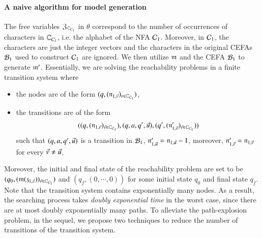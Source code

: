 \paragraph*{A naive algorithm for model generation}
The free variables $\mathfrak{Z}_{\mathbb{C}_{\mathcal{C}_1}}$ in $\theta$ correspond to the number of occurrences of characters in $\mathbb{C}_{\mathcal{C}_1}$, i.e. the alphabet of the NFA $\mathcal{C}_1$. Moreover, in $\mathcal{C}_1$, the characters are just the integer vectors and the characters in the original CEFAs $\mathcal{B}_1$ used to construct $\mathcal{C}_1$ are ignored. 
We then utilize $\mathfrak{m}$ and the CEFA $\mathcal{B}_1$ to generate $\mathfrak{m}'$. Essentially, we are solving the reachability problems in a finite transition system where 
\begin{itemize}
\item the nodes are of the form $(q, (\mathfrak{n}_{1, \vec{v}})_{v \in \mathbb{C}_{\mathcal{C}_1}})$,
%
\item the transitions are of the form 
$$((q, (\mathfrak{n}_{1, \vec{v}})_{\vec{v} \in \mathbb{C}_{\mathcal{C}_1}}), (q, a, q', \vec{u}), (q', (\mathfrak{n}'_{1, \vec{v}})_{\vec{v} \in \mathbb{C}_{\mathcal{C}_1}}))$$
such that $(q, a, q', \vec{u})$ is a transition in $\mathcal{B}_1$, $\mathfrak{n}'_{1, \vec{u}} = \mathfrak{n}_{1, \vec{u}}-1$, moreover, $\mathfrak{n}'_{1, \vec{v}} = \mathfrak{n}_{1, \vec{v}}$ for every $\vec{v} \neq \vec{u}$. 
\end{itemize}
Moreover, the initial and final state of the reachability problem are set to be $(q_0, (\mathfrak{m}(\mathfrak{z}_{1, \vec{v}}))_{\vec{v} \in \mathbb{C}_{\mathcal{C}_1}})$ and $(q_f, (0,\cdots, 0))$ for some initial state $q_0$ and final state $q_f$. 
Note that the transition system contains exponentially many nodes. As a result, the searching process takes \emph{doubly exponential time} in the worst case, since there are at most doubly exponentially many paths. To alleviate the path-explosion problem, in the sequel, we propose two techniques to reduce the number of transitions of the transition system. 


